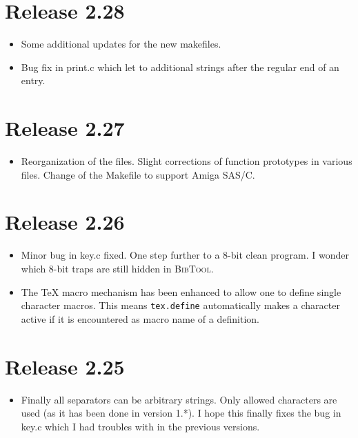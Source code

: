 \documentclass[11pt,a4paper]{scrartcl}
\newcommand\rsc[1]{\texttt{#1}}
\newcommand\File[1]{\textsf{#1}}
\newcommand\BibTool{\textsc{BibTool}}
\newenvironment{Release}[2]{%
  \def\tmp{#2}%
  \section*{Release #1 \ifx\tmp\empty\else{\normalsize[#2]}\fi}
  \begin{itemize}
}{\end{itemize}}
\newenvironment{Fix}[1]{\item }{}
\newenvironment{Update}[1]{\item }{}
\begin{document}
\begin{multicols}
 \begin{Release}{2.28}{}
  \begin{Update}{gene}
    Some additional updates for the new makefiles.
  \end{Update}
  \begin{Fix}{gene}
    Bug fix in \File{print.c} which let to additional strings after the
    regular end of an entry.
  \end{Fix}
 \end{Release}

 \begin{Release}{2.27}{}
  \begin{Update}{gene}
    Reorganization of the files. Slight corrections of function
    prototypes in various files. Change of the \File{Makefile} to
    support Amiga SAS/C.
  \end{Update}
 \end{Release}

 \begin{Release}{2.26}{}
  \begin{Fix}{gene}
    Minor bug in \File{key.c} fixed. One step further to a 8-bit clean
    program. I wonder which 8-bit traps are still hidden in \BibTool.
  \end{Fix}
  \begin{Update}{gene}
    The \TeX{} macro mechanism has been enhanced to allow one to define
    single character macros. This means \rsc{tex.define}
    automatically makes a character active if it is encountered as
    macro name of a definition.
  \end{Update}
 \end{Release}

 \begin{Release}{2.25}{}
  \begin{Update}{gene}
    Finally all separators can be arbitrary strings. Only allowed
    characters are used (as it has been done in version 1.*). I hope
    this finally fixes the bug in key.c which I had troubles with in
    the previous versions.
  \end{Update}
 \end{Release}


\end{multicols}
\end{document}
